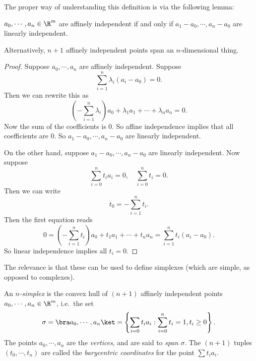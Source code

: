 \documentclass[a4paper]{article}
\begin{document}
The proper way of understanding this definition is via the following lemma:
\begin{lemma}
  $a_0, \cdots, a_n \in \R^m$ are affinely independent if and only if $a_1 - a_0, \cdots, a_n - a_0$ are linearly independent.
\end{lemma}
Alternatively, $n + 1$ affinely independent points span an $n$-dimensional thing.

\begin{proof}
  Suppose $a_0, \cdots, a_n$ are affinely independent. Suppose
  \[
    \sum_{i = 1}^n \lambda_i (a_i - a_0) = 0.
  \]
  Then we can rewrite this as
  \[
    \left(-\sum_{i = 1}^n \lambda_i\right)a_0 + \lambda_1 a_1 + \cdots + \lambda_n a_n = 0.
  \]
  Now the sum of the coefficients is $0$. So affine independence implies that all coefficients are $0$. So $a_1 - a_0, \cdots, a_n - a_0$ are linearly independent.

  On the other hand, suppose $a_1 - a_0, \cdots, a_n - a_0$ are linearly independent. Now suppose
  \[
    \sum_{i = 0}^n t_i a_i = 0,\quad \sum_{i = 0}^n t_i = 0.
  \]
  Then we can write
  \[
    t_0 = -\sum_{i = 1}^n t_i.
  \]
  Then the first equation reads
  \[
    0 = \left(-\sum_{i = 1}^n t_i \right)a_0 + t_1 a_1 + \cdots + t_n a_n = \sum_{i = 1}^n t_i (a_i - a_0).
  \]
  So linear independence implies all $t_i = 0$.
\end{proof}

The relevance is that these can be used to define simplexes (which are simple, as opposed to complexes).
\begin{defi}[$n$-simplex]
  An \emph{$n$-simplex} is the convex hull of $(n + 1)$ affinely independent points $a_0, \cdots, a_n \in \R^m$, i.e.\ the set
  \[
    \sigma = \bra a_0, \cdots, a_n\ket = \left\{\sum_{i = 0} t_i a_i : \sum_{i = 0}^n t_i = 1,t_i \geq 0\right\}.
  \]
  The points $a_0, \cdots, a_n$ are the \emph{vertices}, and are said to \emph{span} $\sigma$. The $(n + 1)$ tuples $(t_0, \cdots, t_n)$ are called the \emph{barycentric coordinates} for the point $\sum t_i a_i$.
\end{defi}
\end{document}
